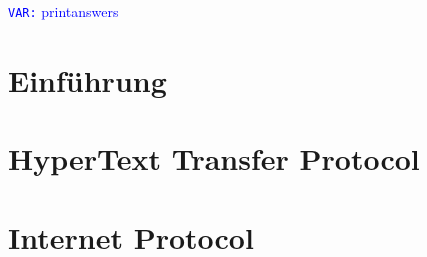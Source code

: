 \documentclass[addpoints,12pt]{exam}
\newcommand{\VAR}[1]{\textcolor{blue}{\texttt{VAR:} #1}}
\begin{document}
\VAR{printanswers}


\begin{questions}

	\section{Einführung}
	
	\clearpage

	\section{HyperText Transfer Protocol}
	
	\clearpage

	\section{Internet Protocol}
	
	\clearpage

\end{questions}
\end{document}
